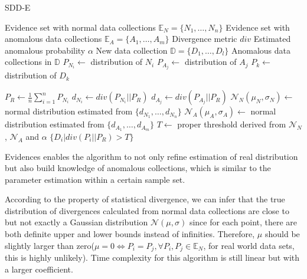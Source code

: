 \documentclass{article}
\begin{document}
			\begin{algorithm}[!t]
				\caption{SDD-E}
				\label{alg:sdd-e}
				\begin{algorithmic}[1]
					\Require Evidence set with normal data collections $\mathbb{E}_N = \{N_1, \dots, N_n\}$
					\Require Evidence set with anomalous data collections $\mathbb{E}_A = \{A_1, \dots, A_m\}$
					\Require Divergence metric $div$
					\Require Estimated anomalous probability $\alpha$
					\Require New data collection $\mathbb{D} = \{D_1, \dots, D_l\}$
					\Ensure Anomalous data collections in $\mathbb{D}$
						\State $P_{N_i} \gets$ distribution of $N_i$\label{line:hist-1}
						\State $P_{A_j} \gets$ distribution of $A_j$\label{line:hist-2}
						\State $P_k \gets$ distribution of $D_k$
					\EndFor
					
					\State $P_R \gets \frac{1}{n}\sum_{i=1}^{n}P_{N_i}$
						\State $d_{N_i} \gets div(P_{N_i}||P_R)$
						\State $d_{A_j} \gets div(P_{A_j}||P_R)$
					\EndFor
					\State $\mathcal{N}_N(\mu_N, \sigma_N) \gets$ normal distribution estimated from $\{d_{N_1}, \dots, d_{N_n}\}$
					\State $\mathcal{N}_A(\mu_A, \sigma_A) \gets$  normal distribution estimated from $\{d_{A_1}, \dots, d_{A_m}\}$
					\State $T \gets$ proper threshold derived from $\mathcal{N}_N$, $\mathcal{N}_A$ and $\alpha$
					\State \Return $\{D_i | div(P_i||P_R) > T\}$
				\end{algorithmic}
			\end{algorithm}
	
			Evidences enables the algorithm to not only refine estimation of real distribution but also build knowledge of anomalous collections, which is similar to the parameter estimation within a certain sample set.
			
			According to the property of statistical divergence, we can infer that the true distribution of divergences calculated from normal data collections are close to but not exactly a Gaussian distribution $\mathcal{N}(\mu, \sigma)$ since for each point, there are both definite upper and lower bounds instead of infinities. Therefore, $\mu$ should be slightly larger than zero($\mu = 0 \iff P_i = P_j, \forall P_i, P_j \in \mathbb{E}_N$, for real world data sets, this is highly unlikely). Time complexity for this algorithm is still linear but with a larger coefficient.
			
\end{document}
